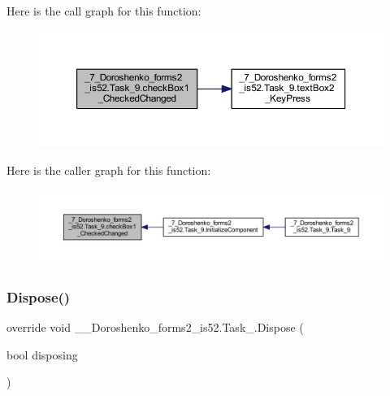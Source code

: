 Here is the call graph for this function\+:
\nopagebreak
\begin{figure}[H]
\begin{center}
\leavevmode
\includegraphics[width=350pt]{class__7___doroshenko__forms2__is52_1_1_task__9_a0ff0bb8624f4a84309bfdfd506377c16_cgraph}
\end{center}
\end{figure}
Here is the caller graph for this function\+:
\nopagebreak
\begin{figure}[H]
\begin{center}
\leavevmode
\includegraphics[width=350pt]{class__7___doroshenko__forms2__is52_1_1_task__9_a0ff0bb8624f4a84309bfdfd506377c16_icgraph}
\end{center}
\end{figure}
\hypertarget{class__7___doroshenko__forms2__is52_1_1_task__9_a2d5755b18b5de4620bf494496877c715}{}\label{class__7___doroshenko__forms2__is52_1_1_task__9_a2d5755b18b5de4620bf494496877c715} 
\subsubsection{\texorpdfstring{Dispose()}{Dispose()}}
{\footnotesize\ttfamily override void \+\_\+\_\+\+Doroshenko\+\_\+forms2\+\_\+is52.\+Task\+\_.\+Dispose (\begin{DoxyParamCaption}\item[{bool}]{disposing }\end{DoxyParamCaption})\hspace{0.3cm}{\ttfamily [protected]}}



